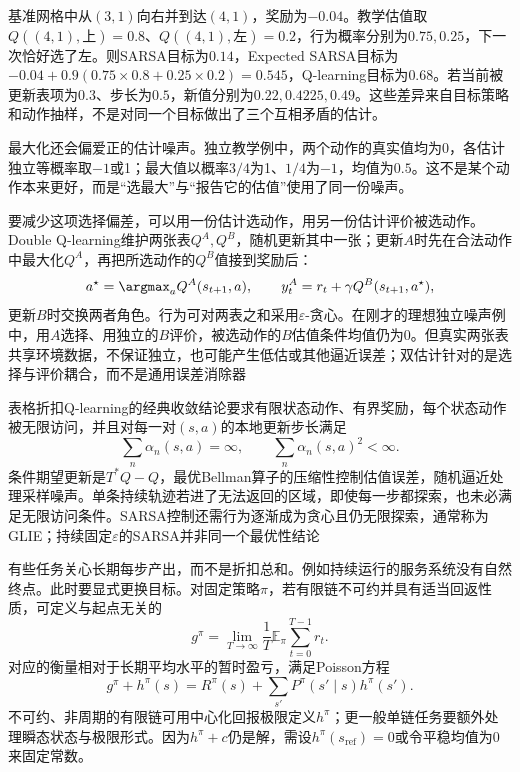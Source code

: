 \begin{example}
  \label{ex:rl-learning-sarsa-q}
  基准网格中从$(3,1)$向右并到达$(4,1)$，奖励为$-0.04$。教学估值取$Q((4,1),\text{上})=0.8$、$Q((4,1),\text{左})=0.2$，行为概率分别为$0.75,0.25$，下一次恰好选了左。则SARSA目标为$0.14$，Expected SARSA目标为$-0.04+0.9(0.75\times0.8+0.25\times0.2)=0.545$，Q-learning目标为$0.68$。若当前被更新表项为$0.3$、步长为$0.5$，新值分别为$0.22,0.4225,0.49$。这些差异来自目标策略和动作抽样，不是对同一个目标做出了三个互相矛盾的估计。
\end{example}

最大化还会偏爱正的估计噪声。独立教学例中，两个动作的真实值均为0，各估计独立等概率取$-1$或1；最大值以概率$3/4$为1、$1/4$为$-1$，均值为$0.5$。这不是某个动作本来更好，而是“选最大”与“报告它的估值”使用了同一份噪声。

要减少这项选择偏差，可以用一份估计选动作，用另一份估计评价被选动作。Double Q-learning维护两张表$Q^A,Q^B$，随机更新其中一张；更新$A$时先在合法动作中最大化$Q^A$，再把所选动作的$Q^B$值接到奖励后：
\begin{equation}
  a^\star=\argmax_a Q^A(s_{t+1},a),\qquad
  y_t^A=r_t+\gamma Q^B(s_{t+1},a^\star),
  \label{eq:rl-learning-double-q}
\end{equation}
更新$B$时交换两者角色。行为可对两表之和采用$\varepsilon$-贪心。在刚才的理想独立噪声例中，用$A$选择、用独立的$B$评价，被选动作的$B$估值条件均值仍为0。但真实两张表共享环境数据，不保证独立，也可能产生低估或其他逼近误差；双估计针对的是选择与评价耦合，而不是通用误差消除器

表格折扣Q-learning的经典收敛结论要求有限状态动作、有界奖励，每个状态动作被无限访问，并且对每一对$(s,a)$的本地更新步长满足
\[
  \sum_n\alpha_n(s,a)=\infty,\qquad
  \sum_n\alpha_n(s,a)^2<\infty .
\]
条件期望更新是$T^*Q-Q$，最优Bellman算子的压缩性控制估值误差，随机逼近处理采样噪声。单条持续轨迹若进了无法返回的区域，即使每一步都探索，也未必满足无限访问条件。SARSA控制还需行为逐渐成为贪心且仍无限探索，通常称为GLIE；持续固定$\varepsilon$的SARSA并非同一个最优性结论

有些任务关心长期每步产出，而不是折扣总和。例如持续运行的服务系统没有自然终点。此时要显式更换目标。对固定策略$\pi$，若有限链不可约并具有适当回返性质，可定义与起点无关的
\[
  g^\pi=\lim_{T\to\infty}\frac1T
      \mathbb E_\pi\sum_{t=0}^{T-1}r_t .
\]
对应的衡量相对于长期平均水平的暂时盈亏，满足Poisson方程
\begin{equation}
  g^\pi+h^\pi(s)=R^\pi(s)+\sum_{s'}P^\pi(s'\mid s)h^\pi(s').
  \label{eq:rl-learning-average-poisson}
\end{equation}
不可约、非周期的有限链可用中心化回报极限定义$h^\pi$；更一般单链任务要额外处理瞬态状态与极限形式。因为$h^\pi+c$仍是解，需设$h^\pi(s_{\mathrm{ref}})=0$或令平稳均值为0来固定常数。

